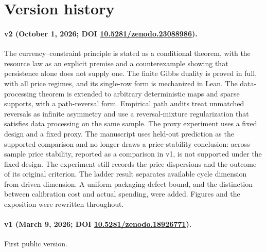 \section{Version history}\label{app:history}

\paragraph{v2 (October 1, 2026; DOI \href{https://doi.org/10.5281/zenodo.23088986}{10.5281/zenodo.23088986}).} The currency--constraint principle is stated as a conditional theorem, with the resource law as an explicit premise and a counterexample showing that persistence alone does not supply one. The finite Gibbs duality is proved in full, with all price regimes, and its single-row form is mechanized in Lean. The data-processing theorem is extended to arbitrary deterministic maps and sparse supports, with a path-reversal form. Empirical path audits treat unmatched reversals as infinite asymmetry and use a reversal-mixture regularization that satisfies data processing on the same sample. The proxy experiment uses a fixed design and a fixed proxy. The manuscript uses held-out prediction as the supported comparison and no longer draws a price-stability conclusion: across-sample price stability, reported as a comparison in v1, is not supported under the fixed design. The experiment still records the price dispersions and the outcome of its original criterion. The ladder result separates available cycle dimension from driven dimension. A uniform packaging-defect bound, and the distinction between calibration cost and actual spending, were added. Figures and the exposition were rewritten throughout.

\paragraph{v1 (March 9, 2026; DOI \href{https://doi.org/10.5281/zenodo.18926771}{10.5281/zenodo.18926771}).} First public version.
